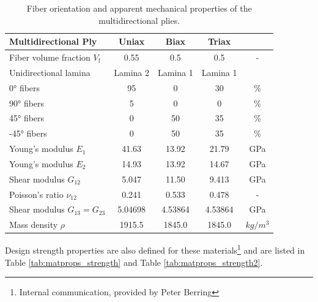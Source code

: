 \begin{table}[h!]
\caption{Fiber orientation and apparent mechanical properties of the multidirectional plies.}
\setlength\extrarowheight{2pt}
\centering
\begin{threeparttable}
\begin{tabular}{lcccc}
\hline
Multidirectional Ply    &  \multicolumn{1}{c}{Uniax}  &  \multicolumn{1}{c}{Biax}  & \multicolumn{1}{c}{Triax}  & \tabularnewline
\hline
Fiber volume fraction  $V_\text{f}$   &  0.55  &  0.5  &  0.5  &  -        \tabularnewline
Unidirectional lamina  & \multicolumn{1}{c}{Lamina 2} & \multicolumn{1}{c}{Lamina 1}    & \multicolumn{1}{c}{Lamina 1} & \tabularnewline
\hline
\ang{0} fibers                        &  95    &  0    &  30   & \%  \tabularnewline
\ang{90} fibers                       &  5     &  0    &  0    & \%  \tabularnewline
\ang[retain-explicit-plus]{+45} fibers                       &  0     &  50   &  35   & \%  \tabularnewline
\ang{-45} fibers                      &  0     &  50   &  35   & \%  \tabularnewline
\hline
Young's modulus      $E_1$            &  41.63   & 13.92   &   21.79  & GPa      \tabularnewline
Young's modulus      $E_2$            &  14.93   & 13.92   &   14.67  & GPa      \tabularnewline
Shear modulus     $G_{12}$            &  5.047   & 11.50   &   9.413  & GPa      \tabularnewline
Poisson's ratio $\nu_{12}$            &  0.241   & 0.533   &   0.478  & -        \tabularnewline
Shear modulus $G_{13}=G_{23}$\tnote{(a)} &  5.04698 & 4.53864 &  4.53864 & GPa      \tabularnewline
Mass density        $\rho$            &  1915.5  & 1845.0  &  1845.0  &  $kg/m^3$  \tabularnewline
\hline
\end{tabular}
\end{threeparttable}
\label{tab:robi_matprop_laminates}
\end{table}

Design strength properties are also defined for these materials\footnote{Internal communication, provided by Peter Berring} and are listed in Table \ref{tab:matprops_strength} and Table \ref{tab:matprops_strength2}.

